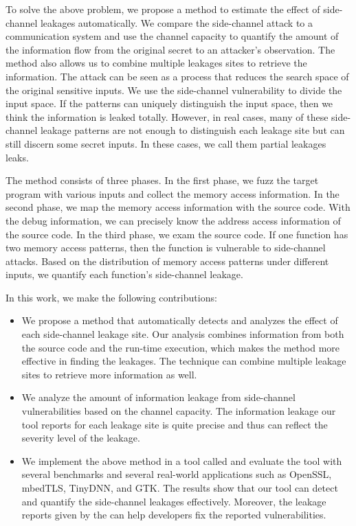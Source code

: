 To solve the above problem, we propose a method to estimate the effect of side-channel leakages automatically. We compare the side-channel attack to a communication system and use the channel capacity to quantify the amount of the information flow from the original secret to an attacker's observation. The method also allows us to combine multiple leakages sites to retrieve the information. The attack can be seen as a process that reduces the search space of the original sensitive inputs. We use the side-channel vulnerability to divide the input space. If the patterns can uniquely distinguish the input space, then we think the information is leaked totally. However, in real cases, many of these side-channel leakage patterns are not enough to distinguish each leakage site but can still discern some secret inputs. In these cases, we call them partial leakages leaks.

The method consists of three phases. In the first phase, we fuzz the target program with various inputs and collect the memory access information. In the second phase, we map the memory access information with the source code. With the debug information, we can precisely know the address access information of the source code. In the third phase, we exam the source code. If one function has two memory access patterns, then the function is vulnerable to side-channel attacks. Based on the distribution of memory access patterns under different inputs, we quantify each function's side-channel leakage.

In this work, we make the following contributions:

\begin{itemize}

  \item We propose a method that automatically detects and analyzes the
  effect of each side-channel leakage site. Our analysis combines
  information from both the source code and the run-time execution,
  which makes the method more effective in finding the leakages. The
  technique can combine multiple leakage sites to retrieve more
  information as well.

  \item We analyze the amount of information leakage from side-channel
  vulnerabilities based on the channel capacity.   The
  information leakage our tool reports for each leakage
  site is quite precise and thus can reflect the severity level of the
  leakage.

  \item We implement the above method in a tool called \ctool{} and
  evaluate the tool with several benchmarks and several real-world
  applications such as OpenSSL, mbedTLS, TinyDNN, and GTK\@. The results
  show that our tool can detect and quantify the side-channel leakages
  effectively. Moreover, the leakage reports given by the \ctool{} can
  help developers fix the reported vulnerabilities.
\end{itemize}

